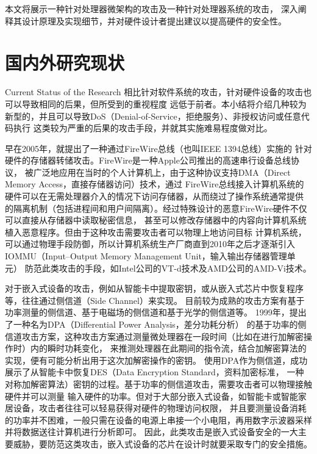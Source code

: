 本文将展示一种针对处理器微架构的攻击及一种针对处理器系统的攻击，
深入阐释其设计原理及实现细节，并对硬件设计者提出建议以提高硬件的安全性。


\section{国内外研究现状}{Current Status of the Research}
相比针对软件系统的攻击，针对硬件设备的攻击也可以导致相同的后果，但所受到的重视程度
远低于前者。本小结将介绍几种较为新型的，并且可以导致DoS（Denial-of-Service，拒绝服务）、非授权访问或任意代码执行
这类较为严重的后果的攻击手段，并就其实施难易程度做对比。

早在2005年，\citet{becher2005firewire}就提出了一种通过FireWire总线（也叫IEEE 1394总线）实施的
针对硬件的存储器转储攻击。FireWire是一种Apple公司推出的高速串行设备总线协议，
被广泛地应用在当时的个人计算机上，由于这种协议支持DMA（Direct Memory Access，直接存储器访问）技术，通过
FireWire总线接入计算机系统的硬件可以在无需处理器介入的情况下访问存储器，从而绕过了操作系统通常提供
的隔离机制（包括进程间和用户间隔离）。经过特殊设计的恶意FireWire硬件不仅可以直接从存储器中读取秘密信息，
甚至可以修改存储器中的内容向计算机系统植入恶意程序。但由于这种攻击需要攻击者可以物理上地访问目标
计算机系统，可以通过物理手段防御，所以计算机系统生产厂商直到2010年之后才逐渐引入IOMMU（Input–Output Memory Management Unit，输入输出存储器管理单元）
防范此类攻击的手段，如Intel公司的VT-d技术及AMD公司的AMD-Vi技术。

对于嵌入式设备的攻击，例如从智能卡中提取密钥，或从嵌入式芯片中恢复程序等，往往通过侧信道（Side Channel）来实现。
目前较为成熟的攻击方案有基于功率测量的侧信道、基于电磁场的侧信道和基于光学的侧信道等。
1999年，\citet{kocher1999differential}提出了一种名为DPA（Differential Power Analysis，差分功耗分析）
的基于功率的侧信道攻击方案，这种攻击方案通过测量微处理器在一段时间（比如在进行加解密操作时）内的瞬时功耗变化，
来推测处理器在此期间的指令流，结合加解密算法的实现，便有可能分析出用于这次加解密操作的密钥。
\citet{kocher1999differential}使用DPA作为侧信道，成功展示了从智能卡中恢复DES（Data Encryption Standard，资料加密标准，
一种对称加解密算法）密钥的过程。基于功率的侧信道攻击，需要攻击者可以物理接触硬件并可以测量
输入硬件的功率。但对于大部分嵌入式设备，如智能卡或智能家居设备，攻击者往往可以轻易获得对硬件的物理访问权限，
并且要测量设备消耗的功率并不困难，一般只需在设备的电源上串接一个小电阻，再用数字示波器采样并将数据送往计算机进行分析即可。
因此，此类攻击是嵌入式设备安全的一大主要威胁，要防范这类攻击，嵌入式设备的芯片在设计时就要采取专门的安全措施。

